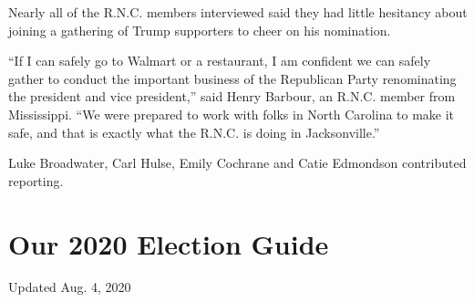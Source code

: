 Nearly all of the R.N.C. members interviewed said they had little
hesitancy about joining a gathering of Trump supporters to cheer on his
nomination.

``If I can safely go to Walmart or a restaurant, I am confident we can
safely gather to conduct the important business of the Republican Party
renominating the president and vice president,'' said Henry Barbour, an
R.N.C. member from Mississippi. ``We were prepared to work with folks in
North Carolina to make it safe, and that is exactly what the R.N.C. is
doing in Jacksonville.''

Luke Broadwater, Carl Hulse, Emily Cochrane and Catie Edmondson
contributed reporting.

\hypertarget{our-2020-election-guide}{%
\section{Our 2020 Election Guide}\label{our-2020-election-guide}}

Updated Aug. 4, 2020

